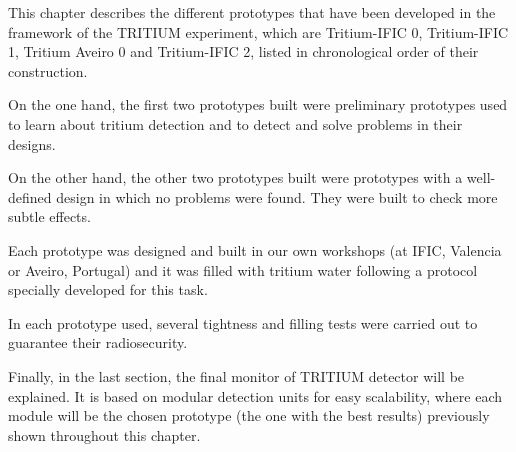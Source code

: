 This chapter describes the different prototypes that have been developed in the framework of the TRITIUM experiment, which are Tritium-IFIC 0, Tritium-IFIC 1, Tritium Aveiro 0 and Tritium-IFIC 2, listed in chronological order of their construction.

On the one hand, the first two prototypes built were preliminary prototypes used to learn about tritium detection and to detect and solve problems in their designs.

On the other hand, the other two prototypes built were prototypes with a well-defined design in which no problems were found. They were built to check more subtle effects.

Each prototype was designed and built in our own workshops (at IFIC, Valencia or Aveiro, Portugal) and it was filled with tritium water following a protocol specially developed for this task.

In each prototype used, several tightness and filling tests were carried out to guarantee their radiosecurity.

Finally, in the last section, the final monitor of TRITIUM detector will be explained. It is based on modular detection units for easy scalability, where each module will be the chosen prototype (the one with the best results) previously shown throughout this chapter.